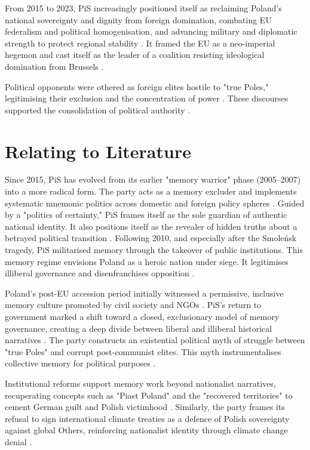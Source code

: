 From 2015 to 2023, PiS increasingly positioned itself as reclaiming Poland’s national sovereignty and dignity from foreign domination, combating EU federalism and political homogenisation, and advancing military and diplomatic strength to protect regional stability \citep{pis_program_2023}. It framed the EU as a neo-imperial hegemon and cast itself as the leader of a coalition resisting ideological domination from Brussels \citep{riedel_tri-marium_2022}. 

\pagebreak

Political opponents were othered as foreign elites hostile to "true Poles," legitimising their exclusion and the concentration of power \citep{siedlicka_pis_2015}. These discourses supported the consolidation of political authority \citep{wronski_pis_2015}.

\section{Relating to Literature}

Since 2015, PiS has evolved from its earlier "memory warrior" phase (2005–2007) into a more radical form. The party acts as a memory excluder and implements systematic mnemonic politics across domestic and foreign policy spheres \citep{mazzini_three-dimensional_2018}. Guided by a "politics of certainty," PiS frames itself as the sole guardian of authentic national identity. It also positions itself as the revealer of hidden truths about a betrayed political transition \citep{dujisin_reassessing_2024}. Following 2010, and especially after the Smoleńsk tragedy, PiS militarised memory through the takeover of public institutions. This memory regime envisions Poland as a heroic nation under siege. It legitimises illiberal governance and disenfranchises opposition \citep{woycicka_mnemonic_2024}.

Poland’s post-EU accession period initially witnessed a permissive, inclusive memory culture promoted by civil society and NGOs \citep{stanczyk_commemorating_2014}. PiS’s return to government marked a shift toward a closed, exclusionary model of memory governance, creating a deep divide between liberal and illiberal historical narratives \citep{stanczyk_commemorating_2014}. The party constructs an existential political myth of struggle between "true Poles" and corrupt post-communist elites. This myth instrumentalises collective memory for political purposes \citep{korycki_memory_2017}.

Institutional reforms support memory work beyond nationalist narratives, recuperating concepts such as "Piast Poland" and the "recovered territories" to cement German guilt and Polish victimhood \citep{langenbacher_twenty-first_2008}. Similarly, the party frames its refusal to sign international climate treaties as a defence of Polish sovereignty against global Others, reinforcing nationalist identity through climate change denial \citep{ulanowski_pis_2015}.

